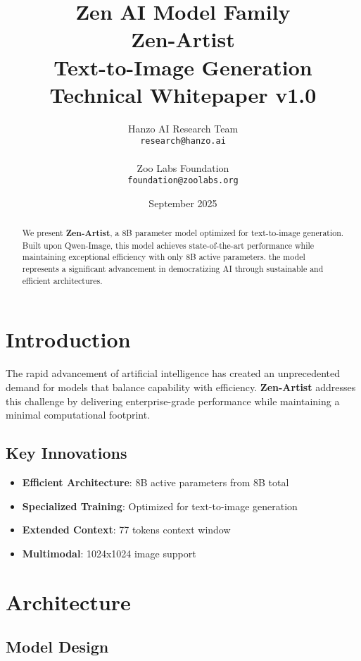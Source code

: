 \documentclass[11pt,a4paper]{article}
\title{
    \vspace{-2cm}
    \Large \textbf{Zen AI Model Family} \\
    \vspace{0.5cm}
    \Huge \textbf{Zen-Artist} \\
    \vspace{0.3cm}
    \large Text-to-Image Generation \\
    \vspace{0.5cm}
    \normalsize Technical Whitepaper v1.0
}
\author{
    Hanzo AI Research Team \\
    \texttt{research@hanzo.ai} \\
    \\
    Zoo Labs Foundation \\
    \texttt{foundation@zoolabs.org}
}
\date{September 2025}
\begin{document}
\maketitle

\begin{abstract}
We present \textbf{Zen-Artist}, a 8B parameter model optimized for text-to-image generation. 
Built upon Qwen-Image, this model achieves state-of-the-art performance while maintaining exceptional efficiency 
with only 8B active parameters. the model represents a significant advancement in democratizing AI through sustainable and efficient architectures.
\end{abstract}

\tableofcontents
\newpage

\section{Introduction}

The rapid advancement of artificial intelligence has created an unprecedented demand for models that balance capability with efficiency. 
\textbf{Zen-Artist} addresses this challenge by delivering enterprise-grade performance while maintaining a minimal computational footprint.

\subsection{Key Innovations}
\begin{itemize}
    \item \textbf{Efficient Architecture}: 8B active parameters from 8B total
    \item \textbf{Specialized Training}: Optimized for text-to-image generation
    \item \textbf{Extended Context}: 77 tokens context window
    
    \item \textbf{Multimodal}: 1024x1024 image support
    
\end{itemize}

\section{Architecture}

\subsection{Model Design}
\end{document}
